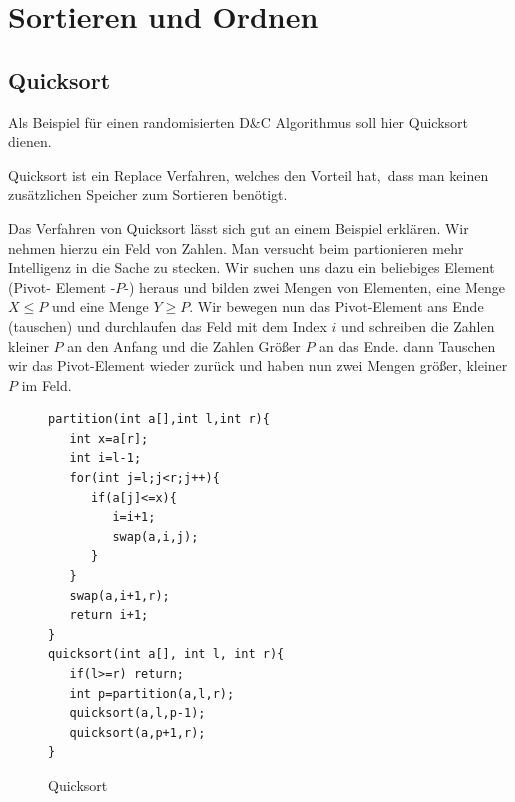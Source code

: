 \documentclass[a4paper,twoside,10pt]{report}
\begin{document}
{\chapter{Sortieren und Ordnen}
\section{Quicksort}
Als Beispiel für einen randomisierten D\&C Algorithmus soll hier Quicksort dienen.

Quicksort ist ein Replace Verfahren, welches den Vorteil hat, \,dass man keinen \,zusätzlichen Speicher zum Sortieren benötigt.

Das Verfahren von Quicksort lässt sich gut an einem Beispiel erklären.
Wir nehmen hierzu ein Feld von Zahlen.
Man versucht beim partionieren mehr Intelligenz in die Sache zu stecken.
Wir suchen uns dazu ein beliebiges Element (Pivot- Element -$P$-) heraus und bilden zwei Mengen von Elementen, eine Menge $X\le P$ und eine Menge $Y\ge P$. Wir bewegen nun das Pivot-Element ans Ende (tauschen) und durchlaufen das Feld mit dem Index $i$ und schreiben die Zahlen kleiner $P$ an den Anfang und die Zahlen Größer $P$ an das Ende.
dann Tauschen wir das Pivot-Element wieder zurück und haben nun zwei Mengen größer, kleiner $P$ im Feld.
\begin{figure}[H]
\begin{verbatim}
partition(int a[],int l,int r){
   int x=a[r];
   int i=l-1;
   for(int j=l;j<r;j++){
      if(a[j]<=x){
         i=i+1;
         swap(a,i,j);
      }
   }
   swap(a,i+1,r);
   return i+1;
}
quicksort(int a[], int l, int r){
   if(l>=r) return;
   int p=partition(a,l,r);
   quicksort(a,l,p-1);
   quicksort(a,p+1,r);
}
\end{verbatim}
\caption{Quicksort}
\end{figure}
}
\end{document}
